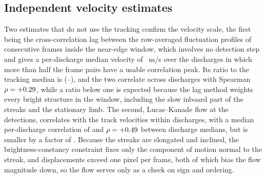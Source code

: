 \subsection{Independent velocity estimates}
Two estimates that do not use the tracking confirm the velocity scale, the first being the cross-correlation lag between the row-averaged fluctuation profiles of consecutive frames inside the near-edge window, which involves no detection step and gives a per-discharge median velocity of \xcorrVMed{}~m/s over the \nXcorr{} discharges in which more than half the frame pairs have a usable correlation peak. Its ratio to the tracking median is \xcorrRatioMed{} (\xcorrRatioLo--\xcorrRatioHi), and the two correlate across discharges with Spearman $\rho = +0.29$, while a ratio below one is expected because the lag method weights every bright structure in the window, including the slow inboard part of the streaks and the stationary limb. The second, Lucas--Kanade flow at the detections, correlates with the track velocities within discharges, with a median per-discharge correlation of \lkAgreeMed{} and $\rho = +0.49$ between discharge medians, but is smaller by a factor of \lkRatioMed. Because the streaks are elongated and inclined, the brightness-constancy constraint fixes only the component of motion normal to the streak, and displacements exceed one pixel per frame, both of which bias the flow magnitude down, so the flow serves only as a check on sign and ordering.
